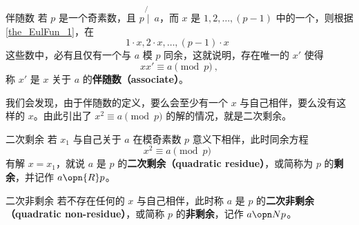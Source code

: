 
\begin{definition}{伴随数}
若 $p$ 是一个奇素数，且 $p \not{\mid}~ a$，而 $x$ 是 $1, 2, \dots, (p-1)$ 中的一个，则根据\autoref{the_EulFun_1}，在
\begin{equation}
1 \cdot x, 2 \cdot x, \dots, (p-1)\cdot x ~~
\end{equation}
这些数中，必有且仅有一个与 $a$ 模 $p$ 同余，这就说明，存在唯一的 $x'$ 使得
\begin{equation}
x x' \equiv a \pmod p ~,
\end{equation}
称 $x'$ 是 $x$ 关于 $a$ 的\textbf{伴随数（associate）}。
\end{definition}
我们会发现，由于伴随数的定义，要么会至少有一个 $x$ 与自己相伴，要么没有这样的 $x$。由此引出了 $x^2 \equiv a \pmod p$ 的解的情况，就是二次剩余。
\begin{definition}{二次剩余}
若 $x_1$ 与自己关于 $a$ 在模奇素数 $p$ 意义下相伴，此时同余方程
\begin{equation}
x^2 \equiv a \pmod p ~~
\end{equation}
有解 $x = x_1$，就说 $a$ 是 $p$ 的\textbf{二次剩余（quadratic residue）}，或简称为 $p$ 的\textbf{剩余}，并记作 $a \opn{R} p$。
\end{definition}

\begin{definition}{二次非剩余}
若不存在任何的 $x$ 与自己相伴，此时称 $a$ 是 $p$ 的\textbf{二次非剩余（quadratic non-residue）}，或简称 $p$ 的\textbf{非剩余}，记作 $a \opn N p$。
\end{definition}
